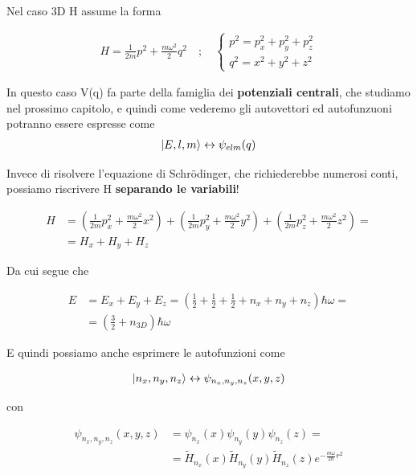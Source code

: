 Nel caso 3D H assume la forma

\begin{align}
H= \frac{1}{2m}p^2 + \frac{m\omega^2}{2}q^2 \quad;\quad 
\left\{
\begin{array}{cc}
p^2= p_x^2 + p_y^2 + p_z^2 \\
q^2= x^2 + y^2 + z^2
\end{array}\right.
\end{align}

In questo caso V(q) fa parte della famiglia dei \textbf{potenziali centrali}, che studiamo nel prossimo capitolo, e quindi come vederemo gli autovettori ed autofunzuoni potranno essere espresse come
\begin{align}
\ket{E,l,m} \leftrightarrow \psi_{elm}(q)
\end{align}

Invece di risolvere l'equazione di Schrödinger, che richiederebbe numerosi conti, possiamo riscrivere H \textbf{separando le variabili}!

\begin{align}
H{}&=\left(\frac{1}{2m} p_x^2  + \frac{m \omega^2}{2}  x^2 \right) + \left(\frac{1}{2m} p_y^2  + \frac{m \omega^2}{2}  y^2 \right) + \left(\frac{1}{2m} p_z^2  + \frac{m \omega^2}{2}  z^2 \right) \nonumber = \\
&= H_x + H_y + H_z
\end{align}

Da cui segue che 

\begin{align}
E{}& = E_x + E_y + E_z = \left( \frac{1}{2}+ \frac{1}{2}+\frac{1}{2} + n_x + n_y + n_z \right) \hbar \omega=\nonumber \\
&= \left(\frac{3}{2} + n_{3D}\right)\hbar \omega
\end{align}

E quindi possiamo anche esprimere le autofunzioni come 

\begin{align}
\ket{n_x, n_y, n_z} \leftrightarrow \psi_{n_x, n_y, n_z}(x,y,z)
\end{align}

con

\begin{align}
\psi_{n_x, n_y, n_z}(x,y,z) {}&= \psi_{n_x}(x) \psi_{n_y}(y) \psi_{n_z}(z)= \nonumber \\ 
&=\tilde{H}_{n_x}(x)\tilde{H}_{n_y}(y)\tilde{H}_{n_z}(z)e^{-\frac{m\omega}{2\hbar}r^2}
\end{align}

